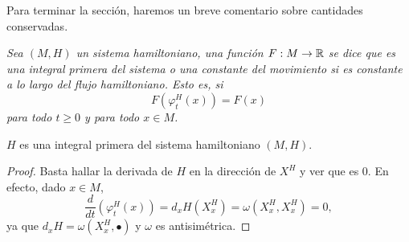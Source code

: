 Para terminar la sección, haremos un breve comentario sobre cantidades conservadas.
\begin{defn}
  \em
  Sea $(M,H)$ un sistema hamiltoniano, una función $F:M \rightarrow \mathbb{R}$ se dice que es una \emph{integral primera} del sistema o una \emph{constante del movimiento} si es constante a lo largo del flujo hamiltoniano. Esto es, si
  \begin{equation*}
    F(\varphi^H_t(x))=F(x)
  \end{equation*}
  para todo $t \geq 0$ y para todo $x \in M$.
  \begin{prop}
    $H$ es una integral primera del sistema hamiltoniano $(M,H)$.
  \end{prop}
  \begin{proof}
    Basta hallar la derivada de $H$ en la dirección de $X^H$ y ver que es 0. En efecto, dado $x \in M$,
    \begin{equation*}
      \frac{d}{dt}\left( \varphi_t^H(x) \right)=d_xH(X_x^H) = \omega(X_x^H,X_x^H)=0,
    \end{equation*}
    ya que $d_xH=\omega(X_x^H,\bullet)$ y $\omega$ es antisimétrica.
  \end{proof}
\end{defn}

